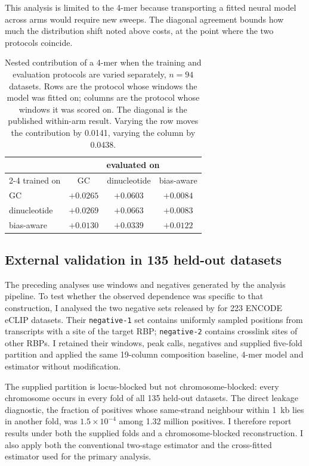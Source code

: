 This analysis is limited to the 4-mer because transporting a fitted neural model across arms
would require new sweeps. The diagonal agreement bounds how much the distribution shift noted
above costs, at the point where the two protocols coincide.

\begin{table}[htbp]
\centering
\caption{Nested contribution of a 4-mer when the training and evaluation protocols are varied
separately, $n=94$ datasets. Rows are the protocol whose windows the model was fitted on;
columns are the protocol whose windows it was scored on. The diagonal is the published
within-arm result. Varying the row moves the contribution by 0.0141, varying the column by
0.0438.}
\label{tab:transport}
\begin{tabular}{lccc}
\toprule
& \multicolumn{3}{c}{evaluated on} \\
\cmidrule(lr){2-4}
trained on & GC & dinucleotide & bias-aware \\
\midrule
GC           & $+0.0265$ & $+0.0603$ & $+0.0084$ \\
dinucleotide & $+0.0269$ & $+0.0663$ & $+0.0083$ \\
bias-aware   & $+0.0130$ & $+0.0339$ & $+0.0122$ \\
\bottomrule
\end{tabular}
\end{table}

\subsection{External validation in 135 held-out datasets}
\label{sec:external}

The preceding analyses use windows and negatives generated by the analysis pipeline. To test whether the
observed dependence was specific to that construction, I analysed the two negative sets
released by \citet{horlacher2023} for 223 ENCODE eCLIP datasets. Their \texttt{negative-1}
set contains uniformly sampled positions from transcripts with a site of the target RBP;
\texttt{negative-2} contains crosslink sites of other RBPs. I retained their windows, peak
calls, negatives and supplied five-fold partition and applied the same 19-column composition
baseline, 4-mer model and estimator without modification.

The supplied partition is locus-blocked but not chromosome-blocked: every chromosome occurs in
every fold of all 135 held-out datasets. The direct leakage diagnostic, the fraction of
positives whose same-strand neighbour within 1~kb lies in another fold, was
$1.5\times10^{-4}$ among 1.32 million positives. I therefore report results under both the
supplied folds and a chromosome-blocked reconstruction. I also apply both the conventional
two-stage estimator and the cross-fitted estimator used for the primary analysis.


